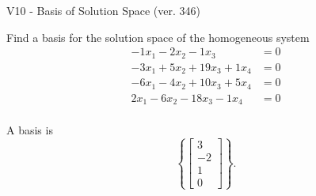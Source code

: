 \begin{exercise}
  \begin{exerciseTitle}V10 - Basis of Solution Space (ver. 346)\end{exerciseTitle}
  \begin{exerciseStatement}
    Find a basis for the solution space of the homogeneous system 
\begin{align*}
 -1 x_ 1 -2 x_ 2 -1 x_ 3 &= 0  \\ 
  -3 x_ 1 + 5 x_ 2 + 19 x_ 3 + 1 x_ 4 &= 0  \\ 
  -6 x_ 1 -4 x_ 2 + 10 x_ 3 + 5 x_ 4 &= 0  \\ 
  2 x_ 1 -6 x_ 2 -18 x_ 3 -1 x_ 4 &= 0  \\ 
 \end{align*}


 
  \end{exerciseStatement}

  \begin{exerciseAnswer}
   A basis is   
\[\left\{\left[\begin{array}{c}
3 \\
-2 \\
1 \\
0
\end{array}\right]\right\}.\]

  


  \end{exerciseAnswer}
\end{exercise}
